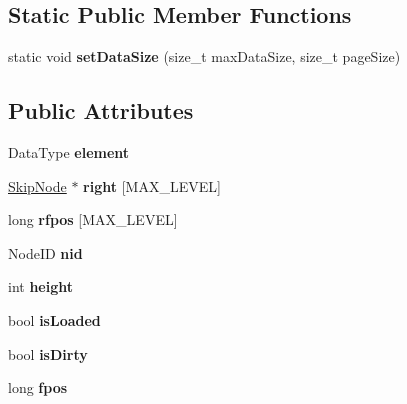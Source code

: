 \subsection*{Static Public Member Functions}
\begin{CompactItemize}
\item 
\hypertarget{classSkipNode_531fa2c8a0a4c89b591fda1919cb5e46}{
static void \textbf{setDataSize} (size\_\-t maxDataSize, size\_\-t pageSize)}
\label{classSkipNode_531fa2c8a0a4c89b591fda1919cb5e46}

\end{CompactItemize}
\subsection*{Public Attributes}
\begin{CompactItemize}
\item 
\hypertarget{classSkipNode_1f7943416a978894a63c81a426e377a8}{
DataType \textbf{element}}
\label{classSkipNode_1f7943416a978894a63c81a426e377a8}

\item 
\hypertarget{classSkipNode_2001a21c391de95f23122ea9fef78a5a}{
\hyperlink{classSkipNode}{SkipNode} $\ast$ \textbf{right} \mbox{[}MAX\_\-LEVEL\mbox{]}}
\label{classSkipNode_2001a21c391de95f23122ea9fef78a5a}

\item 
\hypertarget{classSkipNode_e1984f45084681671f1d36eacadc3112}{
long \textbf{rfpos} \mbox{[}MAX\_\-LEVEL\mbox{]}}
\label{classSkipNode_e1984f45084681671f1d36eacadc3112}

\item 
\hypertarget{classSkipNode_7d5910026ac2e7780f8d3c253b231d89}{
NodeID \textbf{nid}}
\label{classSkipNode_7d5910026ac2e7780f8d3c253b231d89}

\item 
\hypertarget{classSkipNode_e750e71813045988176d69f04c279007}{
int \textbf{height}}
\label{classSkipNode_e750e71813045988176d69f04c279007}

\item 
\hypertarget{classSkipNode_382b26a902567775b5ae60ed9ffaa6e4}{
bool \textbf{isLoaded}}
\label{classSkipNode_382b26a902567775b5ae60ed9ffaa6e4}

\item 
\hypertarget{classSkipNode_dd031af5d776a6bf86e0dc141b1ad245}{
bool \textbf{isDirty}}
\label{classSkipNode_dd031af5d776a6bf86e0dc141b1ad245}

\item 
\hypertarget{classSkipNode_63be36fdc3730fd2bdd6c2e5277dd75e}{
long \textbf{fpos}}
\label{classSkipNode_63be36fdc3730fd2bdd6c2e5277dd75e}

\end{CompactItemize}
